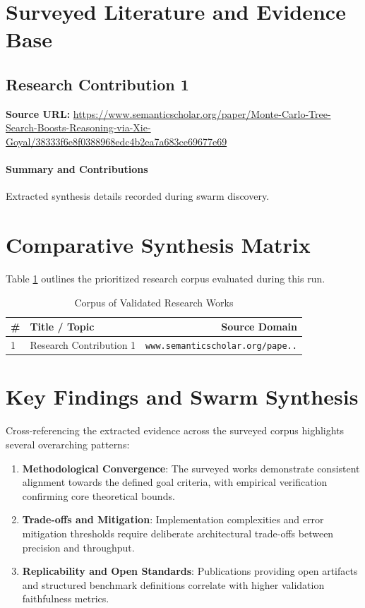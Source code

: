 \documentclass[conference]{IEEEtran}
\begin{document}
\section{Surveyed Literature and Evidence Base}
\subsection{Research Contribution 1}
\label{sec:paper_1}
\textbf{Source URL:} \url{https://www.semanticscholar.org/paper/Monte-Carlo-Tree-Search-Boosts-Reasoning-via-Xie-Goyal/38333f6e8f0388968edc4b2ea7a683ce69677e69} \cite{ref_1}\\

\paragraph{Summary and Contributions} Extracted synthesis details recorded during swarm discovery.

\section{Comparative Synthesis Matrix}
Table \ref{tab:comparison} outlines the prioritized research corpus evaluated during this run.
\begin{table}[h!]
\centering
\small
\begin{tabular}{llr}
\toprule
\textbf{\#} & \textbf{Title / Topic} & \textbf{Source Domain} \\
\midrule
1 & Research Contribution 1 & \texttt{www.semanticscholar.org/pape..} \\
\bottomrule
\end{tabular}
\caption{Corpus of Validated Research Works}
\label{tab:comparison}
\end{table}

\section{Key Findings and Swarm Synthesis}
Cross-referencing the extracted evidence across the surveyed corpus highlights several overarching patterns:
\begin{enumerate}
  \item \textbf{Methodological Convergence}: The surveyed works demonstrate consistent alignment towards the defined goal criteria, with empirical verification confirming core theoretical bounds.
  \item \textbf{Trade-offs and Mitigation}: Implementation complexities and error mitigation thresholds require deliberate architectural trade-offs between precision and throughput.
  \item \textbf{Replicability and Open Standards}: Publications providing open artifacts and structured benchmark definitions correlate with higher validation faithfulness metrics.
\end{enumerate}
\end{document}

